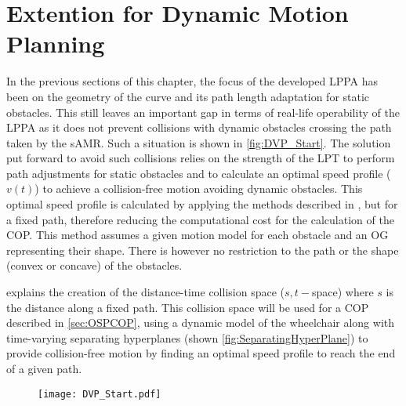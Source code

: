 \newpage

\section{Extention for Dynamic Motion Planning} \label{sec:DynPlan}
In the previous sections of this chapter, the focus of the developed LPPA has been on the geometry of the curve and its path length adaptation for static obstacles. This still leaves an important gap in terms of real-life operability of the LPPA as it does not prevent collisions with dynamic obstacles crossing the path taken by the sAMR. Such a situation is shown in \cref{fig:DVP_Start}. The solution put forward to avoid such collisions relies on the strength of the LPT to perform path adjustments for static obstacles and to calculate an optimal speed profile ($v(t)$) to achieve a collision-free motion avoiding dynamic obstacles. This optimal speed profile is calculated by applying the methods described in , but for a fixed path, therefore reducing the computational cost for the calculation of the COP. This method assumes a given motion model for each obstacle and an OG representing their shape. There is however no restriction to the path or the shape (convex or concave) of the obstacles.

 explains the creation of the distance-time collision space ($s,t-$space) where $s$ is the distance along a fixed path. This collision space will be used for a COP described in \cref{sec:OSPCOP}, using a dynamic model of the wheelchair along with time-varying separating hyperplanes (shown \cref{fig:SeparatingHyperPlane}) to provide collision-free motion by finding an optimal speed profile to reach the end of a given path.

\begin{figure}[!htbp]
\centering
\texttt{[image: DVP\_Start.pdf]}
\end{figure}

\newpage

